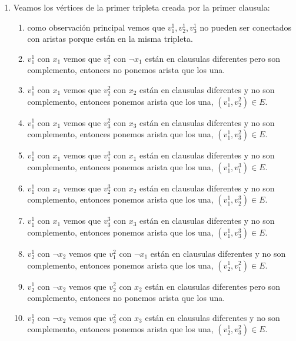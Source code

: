 \documentclass[a4paper]{article}
\begin{document}
\begin{enumerate}
    \item Veamos los vértices de la primer tripleta creada por la primer clausula:
    \begin{enumerate}
        \item como observación principal vemos que $v^1_1,v^1_2,v^1_3$ no pueden ser conectados con aristas porque están en la misma tripleta.
        
        \item $v^1_1$ con $x_1$ vemos que $v^2_1$ con $\neg x_1$ están en clausulas diferentes pero son complemento, entonces no ponemos arista que los una.
        
        \item $v^1_1$ con $x_1$ vemos que $v^2_2$ con $x_2$ están en clausulas diferentes y no son complemento, entonces ponemos arista que los una, $(v^1_1, v^2_2) \in E$.

        \item $v^1_1$ con $x_1$ vemos que $v^2_3$ con $x_3$ están en clausulas diferentes y no son complemento, entonces ponemos arista que los una, $(v^1_1, v^2_3) \in E$.

        \item $v^1_1$ con $x_1$ vemos que $v^3_1$ con $x_1$ están en clausulas diferentes y no son complemento, entonces ponemos arista que los una, $(v^1_1, v^3_1) \in E$.
        
        \item $v^1_1$ con $x_1$ vemos que $v^3_2$ con $x_2$ están en clausulas diferentes y no son complemento, entonces ponemos arista que los una, $(v^1_1, v^3_2) \in E$.

        \item $v^1_1$ con $x_1$ vemos que $v^3_3$ con $x_3$ están en clausulas diferentes y no son complemento, entonces ponemos arista que los una, $(v^1_1, v^3_3) \in E$.

        \item $v^1_2$ con $\neg x_2$ vemos que $v^2_1$ con $\neg x_1$ están en clausulas diferentes y no son complemento, entonces ponemos arista que los una, $(v^1_2, v^2_1) \in E$.
        
        \item $v^1_2$ con $\neg x_2$ vemos que $v^2_2$ con $x_2$ están en clausulas diferentes pero son complemento, entonces no ponemos arista que los una.

        \item $v^1_2$ con $\neg x_2$ vemos que $v^2_3$ con $x_3$ están en clausulas diferentes y no son complemento, entonces ponemos arista que los una, $(v^1_2, v^2_3) \in E$.


\end{enumerate}
\end{enumerate}
\end{document}
